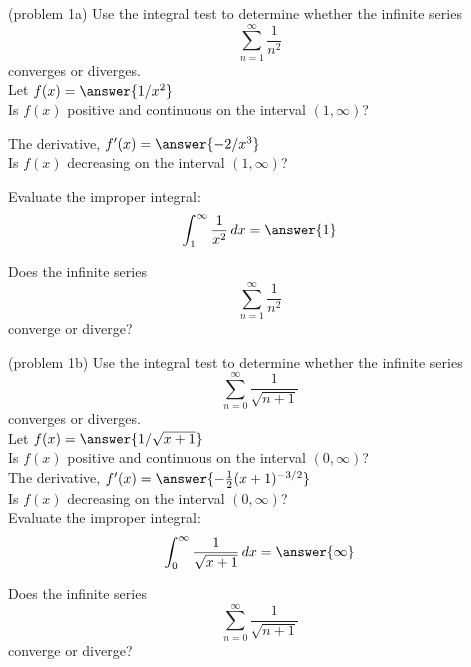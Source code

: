 \documentclass{ximera}
\begin{document}
\begin{problem}(problem 1a)
Use the integral test to determine whether the infinite series
\[
\sum_{n=1}^\infty \frac{1}{n^2}
\]
converges or diverges.\\

Let $f(x) = \answer{ 1/x^2 }$\\

Is $f(x)$ positive and continuous on the interval $(1, \infty)$? 


The derivative, $f'(x) = \answer{-2/x^3}$\\

Is $f(x)$ decreasing on the interval $(1, \infty)$? 


Evaluate the improper integral: 
\[
 \int_1^\infty \frac{1}{x^2} \, dx = \answer{1}
\]

Does the infinite series
\[
\sum_{n=1}^\infty  \frac{1}{n^2}
\]
converge or diverge? 


\end{problem}



\begin{problem}(problem 1b)
Use the integral test to determine whether the infinite series
\[
\sum_{n=0}^\infty \frac{1}{\sqrt{n+1}}
\]
converges or diverges.\\

Let $f(x) = \answer{ 1/\sqrt{x+1} }$\\

Is $f(x)$ positive and continuous on the interval $(0, \infty)$?\\


The derivative, $f'(x) = \answer{-\frac12 (x+1)^{-3/2}}$\\

Is $f(x)$ decreasing on the interval $(0, \infty)$? \\


Evaluate the improper integral: 
\[
 \int_0^\infty \frac{1}{\sqrt{x+1}} \, dx = \answer{\infty}
\]

Does the infinite series
\[
\sum_{n=0}^\infty \frac{1}{\sqrt{n+1}}
\]
converge or diverge?


\end{problem}
\end{document}

